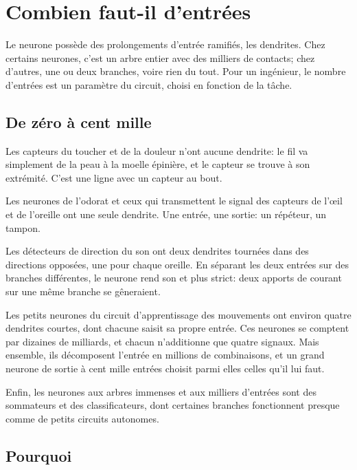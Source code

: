 \chapter{Combien faut-il d'entrées}

Le neurone possède des prolongements d'entrée ramifiés, les dendrites. Chez certains neurones, c'est un arbre entier avec des milliers de contacts; chez d'autres, une ou deux branches, voire rien du tout. Pour un ingénieur, le nombre d'entrées est un paramètre du circuit, choisi en fonction de la tâche.

\section*{De zéro à cent mille}

Les capteurs du toucher et de la douleur n'ont aucune dendrite: le fil va simplement de la peau à la moelle épinière, et le capteur se trouve à son extrémité. C'est une ligne avec un capteur au bout.


Les neurones de l'odorat et ceux qui transmettent le signal des capteurs de l'œil et de l'oreille ont une seule dendrite. Une entrée, une sortie: un répéteur, un tampon.

Les détecteurs de direction du son ont deux dendrites tournées dans des directions opposées, une pour chaque oreille. En séparant les deux entrées sur des branches différentes, le neurone rend son \og et\fg{} plus strict: deux apports de courant sur une même branche se gêneraient.

Les petits neurones du circuit d'apprentissage des mouvements ont environ quatre dendrites courtes, dont chacune saisit sa propre entrée. Ces neurones se comptent par dizaines de milliards, et chacun n'additionne que quatre signaux. Mais ensemble, ils décomposent l'entrée en millions de combinaisons, et un grand neurone de sortie à cent mille entrées choisit parmi elles celles qu'il lui faut.

Enfin, les neurones aux arbres immenses et aux milliers d'entrées sont des sommateurs et des classificateurs, dont certaines branches fonctionnent presque comme de petits circuits autonomes.

\section*{Pourquoi}

